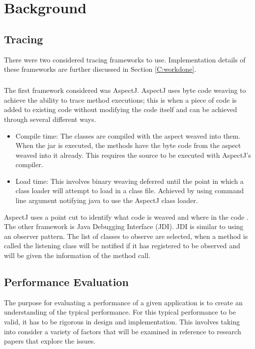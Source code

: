 \chapter{Background}\label{C:related}

\section{Tracing}

There were two considered tracing frameworks to use. Implementation details of these frameworks are further discussed in Section \ref{C:workdone}.
\paragraph{}
The first framework considered was AspectJ. AspectJ uses byte code weaving to achieve the ability to trace method executions; this is when a piece of code is added to existing code without modifying the code itself and can be achieved through several different ways.

\begin{itemize}
\item Compile time:
The classes are compiled with the aspect weaved into them. When the jar is executed, the methods have the byte code from the aspect weaved into it already. This requires the source to be executed with AspectJ's compiler.
\item Load time:
This involves binary weaving deferred until the point in which a class loader will attempt to load in a class file. Achieved by using command line argument notifying java to use the AspectJ class loader.
\end{itemize}

AspectJ uses a point cut to identify what code is weaved and where in the code \cite{aspectwiki}. The other framework is Java Debugging Interface (JDI). JDI is similar to using an observer pattern. The list of classes to observe are selected, when a method is called the listening class will be notified if it has registered to be observed and will be given the information of the method call. 

\section{Performance Evaluation}
\label{performanceEvalBG}
The purpose for evaluating a performance of a given application is to create an understanding of the typical performance. For this typical performance to be valid, it has to be rigorous in design and implementation. This involves taking into consider a variety of factors that will be examined in reference to research papers that explore the issues.

